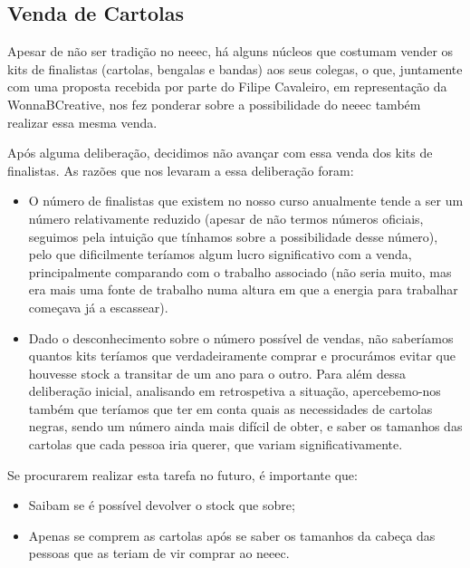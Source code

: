 
\subsection{Venda de Cartolas}

Apesar de não ser tradição no \acrshort{neeec}, há alguns núcleos que costumam vender os kits de finalistas (cartolas, bengalas e bandas) aos seus colegas, o que, juntamente com uma proposta recebida por parte do Filipe Cavaleiro, em representação da WonnaBCreative, nos fez ponderar sobre a possibilidade do \acrshort{neeec} também realizar essa mesma venda.

Após alguma deliberação, decidimos não avançar com essa venda dos kits de finalistas. As razões que nos levaram a essa deliberação foram:
\begin{itemize}
\item O número de finalistas que existem no nosso curso anualmente tende a ser um número relativamente reduzido (apesar de não termos números oficiais, seguimos pela intuição que tínhamos sobre a possibilidade desse número), pelo que dificilmente teríamos algum lucro significativo com a venda, principalmente comparando com o trabalho associado (não seria muito, mas era mais uma fonte de trabalho numa altura em que a energia para trabalhar começava já a escassear).
\item Dado o desconhecimento sobre o número possível de vendas, não saberíamos quantos kits teríamos que verdadeiramente comprar e procurámos evitar que houvesse stock a transitar de um ano para o outro.
Para além dessa deliberação inicial, analisando em retrospetiva a situação, apercebemo-nos também que teríamos que ter em conta quais as necessidades de cartolas negras, sendo um número ainda mais difícil de obter, e saber os tamanhos das cartolas que cada pessoa iria querer, que variam significativamente.
\end{itemize}

Se procurarem realizar esta tarefa no futuro, é importante que:
\begin{itemize}
\item Saibam se é possível devolver o stock que sobre;
\item Apenas se comprem as cartolas após se saber os tamanhos da cabeça das pessoas que as teriam de vir comprar ao \acrshort{neeec}.
\end{itemize}